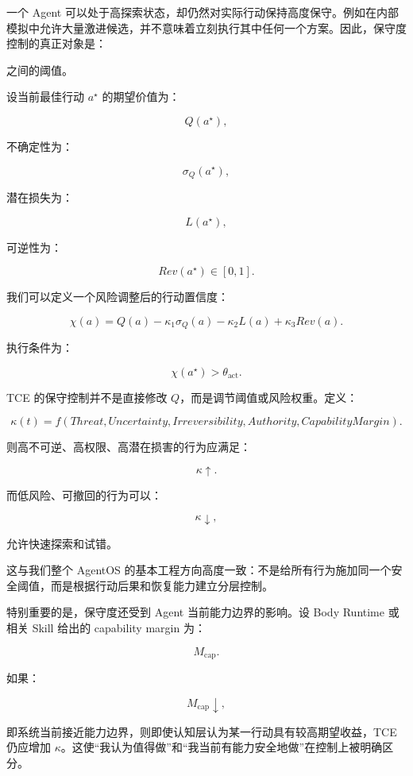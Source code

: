 一个 Agent 可以处于高探索状态，却仍然对实际行动保持高度保守。例如在内部模拟中允许大量激进候选，并不意味着立刻执行其中任何一个方案。因此，保守度控制的真正对象是：

\begin{statementbox}
\centering
{}
\end{statementbox}

之间的阈值。

设当前最佳行动 $a^\star$ 的期望价值为：

\[
Q(a^\star),
\]

不确定性为：

\[
\sigma_Q(a^\star),
\]

潜在损失为：

\[
L(a^\star),
\]

可逆性为：

\[
Rev(a^\star)\in[0,1].
\]

我们可以定义一个风险调整后的行动置信度：

\[
\chi(a)
=
Q(a)
-
\kappa_1\sigma_Q(a)
-
\kappa_2L(a)
+
\kappa_3Rev(a).
\]

执行条件为：

\[
\chi(a^\star)
>
\theta_{\mathrm{act}}.
\]

TCE 的保守控制并不是直接修改 $Q$，而是调节阈值或风险权重。定义：

\[
\kappa(t)
=
f(
Threat,
Uncertainty,
Irreversibility,
Authority,
CapabilityMargin
).
\]

则高不可逆、高权限、高潜在损害的行为应满足：

\[
\kappa\uparrow.
\]

而低风险、可撤回的行为可以：

\[
\kappa\downarrow,
\]

允许快速探索和试错。

这与我们整个 AgentOS 的基本工程方向高度一致：不是给所有行为施加同一个安全阈值，而是根据行动后果和恢复能力建立分层控制。

特别重要的是，保守度还受到 Agent 当前能力边界的影响。设 Body Runtime 或相关 Skill 给出的 capability margin 为：

\[
M_{\mathrm{cap}}.
\]

如果：

\[
M_{\mathrm{cap}}\downarrow,
\]

即系统当前接近能力边界，则即使认知层认为某一行动具有较高期望收益，TCE 仍应增加 $\kappa$。这使“我认为值得做”和“我当前有能力安全地做”在控制上被明确区分。

